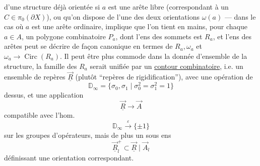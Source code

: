 
d'une structure déjà orientée si $a$ est une arête libre (correspondant à un $C\in\pi_0(\partial X)$), ou qu'on dispose de l'une des deux orientations $\omega(a)$ --- dans le cas où $a$ est une arête ordinaire, implique que l'on tient en mains, pour chaque $a\in A$, un polygone combinatoire $P_a$, dont l'ens des sommets est $R_a$, et l'ens des arêtes peut se décrire  de façon canonique en termes de $R_a,\omega_a$ et $\omega_a\longrightarrow\operatorname{Circ}(R_a)$.
Il peut être plus commode dans la donnée d'ensemble de la structure,  la famille des $R_a$ serait unifiée par un
\uline{contour combinatoire}, i.e. un ensemble de repères $\vec{\underline R}$ (plutôt ``repères de rigidification''), avec une opération de
\[
 \mathbb D_\infty=\{\sigma_0,\sigma_1\mid\sigma_0^2=\sigma_1^2=1\}
\]
dessus, et une application
\[
 \vec{\underline R}\longrightarrow\vec A
\]
compatible avec l'hom.
\[
 \mathbb D_\infty\xrightarrow{\varepsilon}\{\pm1\}
\]
sur les groupes d'opérateurs, mais de plus un sous ens
\[
 \vec{\underline R}_l^+\subset\vec{\underline R}\mid\vec A_l
\]
définissant une orientation  correspondant.
